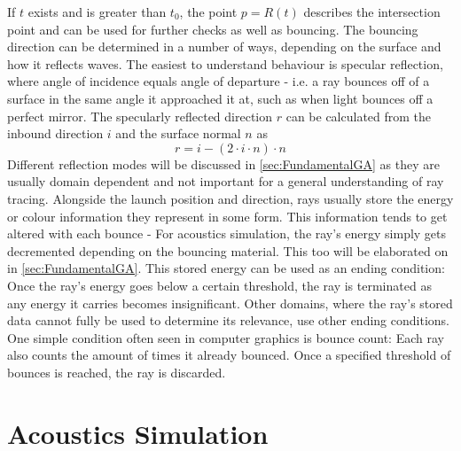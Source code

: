 If \(t\) exists and is greater than \(t_0\),
the point \(p = R(t)\) describes the intersection point and can be used for further checks
as well as bouncing.
\newline
The bouncing direction can be determined in a number of ways,
depending on the surface and how it reflects waves.
The easiest to understand behaviour is specular reflection,
where angle of incidence equals angle of departure -
i.e. a ray bounces off of a surface in the same angle it approached it at,
such as when light bounces off a perfect mirror.
The specularly reflected direction \(r\) can be calculated from the inbound direction \(i\) and the surface normal \(n\) as
\begin{equation}\label{eq:SpecularReflection}
    r = i - (2 \cdot i \cdot n) \cdot n
\end{equation}
Different reflection modes will be discussed in \autoref{sec:FundamentalGA} as they are usually domain dependent
and not important for a general understanding of ray tracing.
\newline
Alongside the launch position and direction,
rays usually store the energy or colour information they represent in some form.
This information tends to get altered with each bounce -
For acoustics simulation, the ray's energy simply gets decremented depending on the bouncing material.
This too will be elaborated on in \autoref{sec:FundamentalGA}.
\newline
This stored energy can be used as an ending condition:
Once the ray's energy goes below a certain threshold,
the ray is terminated as any energy it carries becomes insignificant.
Other domains, where the ray's stored data cannot fully be used to determine its relevance,
use other ending conditions.
One simple condition often seen in computer graphics is bounce count:
Each ray also counts the amount of times it already bounced.
Once a specified threshold of bounces is reached, the ray is discarded.

\section{Acoustics Simulation}\label{sec:FundamentalAcoustics}

